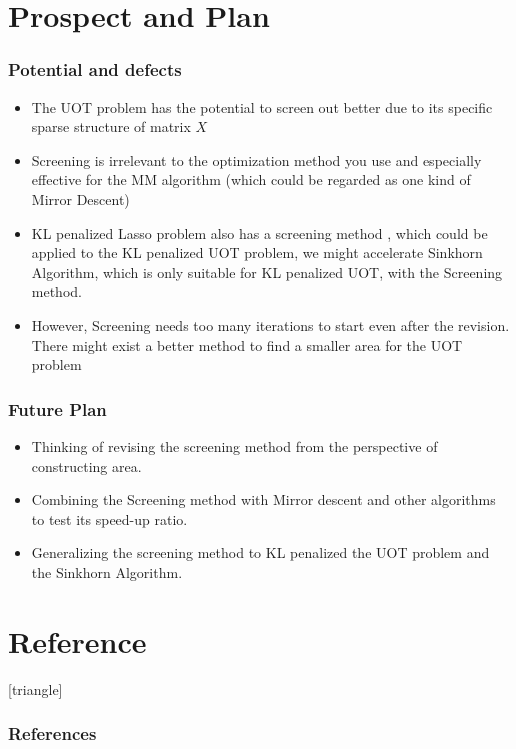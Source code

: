 \documentclass[dvipdfmx,cjk,t,10pt]{beamer}
\begin{document}
\section{Prospect and Plan}
\begin{frame}
\frametitle{Potential and defects}
	\begin{itemize}	
	\item The UOT problem has the potential to screen out better due to its specific sparse structure of matrix $X$
	\item Screening is irrelevant to the optimization method you use and especially effective for the MM algorithm (which could be regarded as one kind of Mirror Descent)
	\item KL penalized Lasso problem also has a screening method \cite{9414183}, which could be applied to the KL penalized UOT problem, we might accelerate Sinkhorn Algorithm, which is only suitable for KL penalized UOT, with the Screening method.
	\item However, Screening needs too many iterations to start even after the revision. There might exist a better method to find a smaller area for the UOT problem
	\end{itemize}	
\end{frame}

\begin{frame}
\frametitle{Future Plan}
	\begin{itemize}
	\item Thinking of revising the screening method from the perspective of constructing area.
	\item Combining the Screening method with Mirror descent and other algorithms to test its speed-up ratio.
	\item Generalizing the screening method to KL penalized the UOT problem and the Sinkhorn Algorithm.  
	\end{itemize}	
\end{frame}

\section{Reference}

\begin{frame}[allowframebreaks]
[triangle]
        \frametitle{References}
        
        
\end{frame}


\begin{frame}
	\begin{center}	
	\vspace*{1.0cm}
	
	\vsp\vsp
	\IMPB{\Large Thank you for listening. }
	\vspace*{1.0cm}
	\end{center}	
	\vspace*{-0.5cm}
\end{frame}
\end{document}
